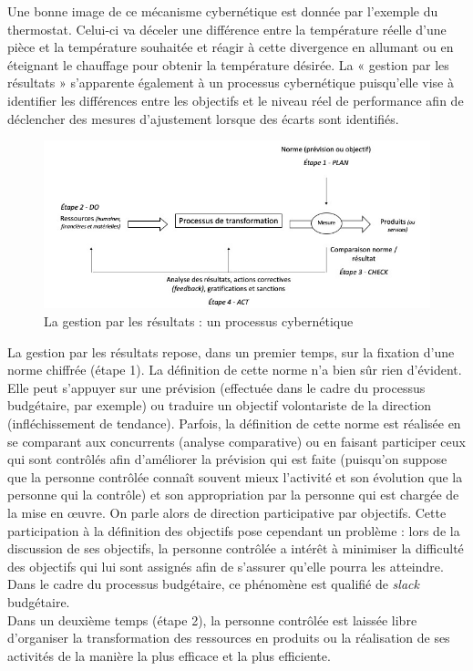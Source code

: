 \documentclass{kaobook}
\begin{document}
Une bonne image de ce mécanisme cybernétique est donnée par l’exemple du thermostat. Celui-ci va déceler une différence entre la température réelle d’une pièce et la température souhaitée et réagir à cette divergence en allumant ou en éteignant le chauffage pour obtenir la température désirée. La « gestion par les résultats » s’apparente également à un processus cybernétique puisqu’elle vise à identifier les différences entre les objectifs et le niveau réel de performance afin de déclencher des mesures d’ajustement lorsque des écarts sont identifiés.\\
\begin{figure}[htbp]
\centering
\includegraphics[width=.9\linewidth]{./img/gestionobj.jpeg}
\caption{La gestion par les résultats : un processus cybernétique}
\end{figure}
La gestion par les résultats repose, dans un premier temps, sur la fixation d’une norme chiffrée (étape 1). La définition de cette norme n’a bien sûr rien d’évident. Elle peut s’appuyer sur une prévision (effectuée dans le cadre du processus budgétaire, par exemple) ou traduire un objectif volontariste de la direction (infléchissement de tendance). Parfois, la définition de cette norme est réalisée en se comparant aux concurrents (analyse comparative) ou en faisant participer ceux qui sont contrôlés afin d’améliorer la prévision qui est faite (puisqu’on suppose que la personne contrôlée connaît souvent mieux l’activité et son évolution que la personne qui la contrôle) et son appropriation par la personne qui est chargée de la mise en œuvre. On parle alors de direction participative par objectifs. Cette participation à la définition des objectifs pose cependant un problème : lors de la discussion de ses objectifs, la personne contrôlée a intérêt à minimiser la difficulté des objectifs qui lui sont assignés afin de s’assurer qu’elle pourra les atteindre. Dans le cadre du processus budgétaire, ce phénomène est qualifié de \emph{slack} budgétaire.\\
 Dans un deuxième temps (étape 2), la personne contrôlée est laissée libre d’organiser la transformation des ressources en produits ou la réalisation de ses activités de la manière la plus efficace et la plus efficiente.\\
\end{document}
